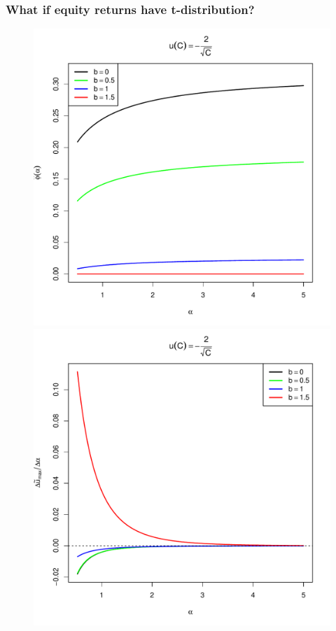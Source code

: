 \documentclass{beamer}
\begin{document}
\begin{frame}
  \frametitle{What if equity returns have t-distribution?}
  \begin{minipage}[t]{0.5\linewidth}
    \begin{figure}[htb!]
      \begin{minipage}{0.5\linewidth}
        \includegraphics[width=\textwidth]{phi_hat_b_t_power.pdf}
      \end{minipage}\hfill
      \begin{minipage}{0.5\linewidth}
        \includegraphics[width=\textwidth]{U_b_t_power.pdf}

\end{minipage}
\end{figure}
\end{minipage}
\end{frame}
\end{document}
